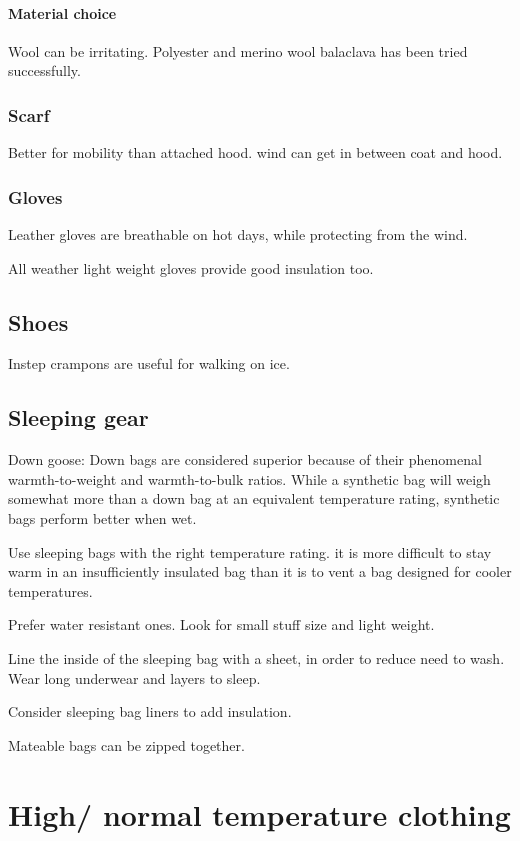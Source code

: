 \documentclass[oneside, article]{memoir}
\begin{document}
\subsubsection{Material choice}
Wool can be irritating. Polyester and merino wool balaclava has been tried successfully.

\subsection{Scarf}
Better for mobility than attached hood. wind can get in between coat and hood.

\subsection{Gloves}

Leather gloves are breathable on hot days, while protecting from the wind.

All weather light weight gloves provide good insulation too.

\section{Shoes}
Instep crampons are useful for walking on ice.


\section{Sleeping gear}
Down goose: Down bags are considered superior because of their phenomenal warmth-to-weight and warmth-to-bulk ratios. While a synthetic bag will weigh somewhat more than a down bag at an equivalent temperature rating, synthetic bags perform better when wet.

Use sleeping bags with the right temperature rating. it is more difficult to stay warm in an insufficiently insulated bag than it is to vent a bag designed for cooler temperatures.

Prefer water resistant ones. Look for small stuff size and light weight.

Line the inside of the sleeping bag with a sheet, in order to reduce need to wash. Wear long underwear and layers to sleep.

Consider sleeping bag liners to add insulation.

Mateable bags can be zipped together.

\chapter{High/ normal temperature clothing}
\end{document}

